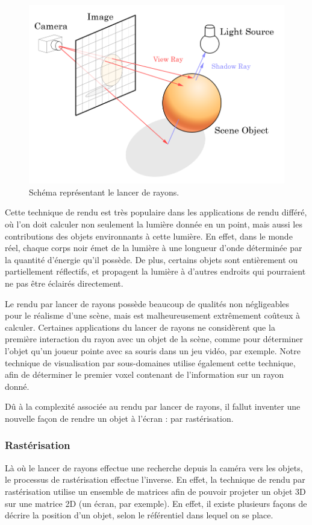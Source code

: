 {{        \begin{figure}[h]
            \centering
            \includegraphics[width=.8\linewidth]{img/Ray_trace_diagram.png}
            \caption{Schéma représentant le lancer de rayons.}
            \label{img:opengl:raytracing}
        \end{figure}

        Cette technique de rendu est très populaire dans les applications de rendu différé, où l'on doit calculer non seulement la lumière donnée en un point, mais aussi les contributions des objets environnants à cette lumière. En effet, dans le monde réel, chaque corps noir émet de la lumière à une longueur d'onde déterminée par la quantité d'énergie qu'il possède. De plus, certains objets sont entièrement ou partiellement réflectifs, et propagent la lumière à d'autres endroits qui pourraient ne pas être éclairés directement.

        Le rendu par lancer de rayons possède beaucoup de qualités non négligeables pour le réalisme d'une scène, mais est malheureusement extrêmement coûteux à calculer. Certaines applications du lancer de rayons ne considèrent que la première interaction du rayon avec un objet de la scène, comme pour déterminer l'objet qu'un joueur pointe avec sa souris dans un jeu vidéo, par exemple. Notre technique de visualisation par sous-domaines utilise également cette technique, afin de déterminer le premier voxel contenant de l'information sur un rayon donné.

        Dû à la complexité associée au rendu par lancer de rayons, il fallut inventer une nouvelle façon de rendre un objet à l'écran : par rastérisation.
    }
    
    \subsubsection{Rastérisation}
    {
        Là où le lancer de rayons effectue une recherche depuis la caméra vers les objets, le processus de rastérisation effectue l'inverse. En effet, la technique de rendu par rastérisation utilise un ensemble de matrices afin de pouvoir projeter un objet 3D sur une matrice 2D (un écran, par exemple). En effet, il existe plusieurs façons de décrire la position d'un objet, selon le référentiel dans lequel on se place.
        
}}
